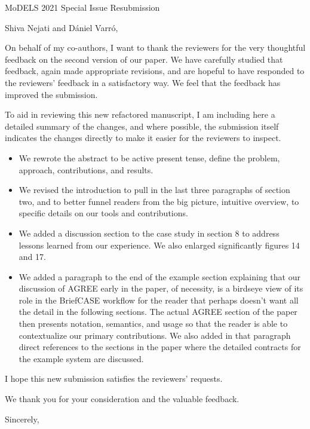 \documentclass[10pt]{byu-cs}
\begin{document}
\pagestyle{headings}

\signature{Eric G Mercer\\
           Associate Professor}

\begin{letter}{MoDELS 2021 Special Issue Resubmission}

\date{\today}

\opening{Shiva Nejati and D\'{a}niel Varr\'{o},}

On behalf of my co-authors, I want to thank the reviewers for the very thoughtful feedback on the second version of our paper.
We have carefully studied that feedback, again made appropriate revisions, and are hopeful to have responded to the reviewers' feedback in a satisfactory way.
We feel that the feedback has improved the submission.

To aid in reviewing this new refactored manuscript, I am including here a detailed summary of the changes, and where possible, the submission itself indicates the changes directly to make it easier for the reviewers to inspect.
\begin{itemize}
  \item We rewrote the abstract to be active present tense, define the problem, approach, contributions, and results.
  \item We revised the introduction to pull in the last three paragraphs of section two, and to better funnel readers from the big picture, intuitive overview, to specific details on our tools and contributions. 
  \item We added a discussion section to the case study in section 8 to address lessons learned from our experience. We also enlarged significantly figures 14 and 17.
  \item We added a paragraph to the end of the example section explaining that our discussion of AGREE early in the paper, of necessity, is a birdseye view of its role in the BriefCASE workflow for the reader that perhaps doesn't want all the detail in the following sections. The actual AGREE section of the paper then presents notation, semantics, and usage so that the reader is able to contextualize our primary contributions. We also added in that paragraph direct references to the sections in the paper where the detailed contracts for the example system are discussed. 
\end{itemize}

I hope this new submission satisfies the reviewers' requests.

We thank you for your consideration and the valuable feedback.

\closing{Sincerely,}

\end{letter}
\end{document}
